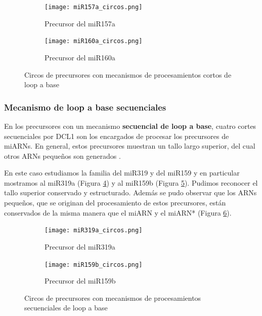 \begin{landscape}
	\begin{figure}
	\centering
	\begin{subfigure}{.75\textwidth}
	  \centering
	  \texttt{[image: miR157a\_circos.png]}
	  \caption{Precursor del miR157a}
	  \label{subfig:miR157a_circos}
	\end{subfigure}%
	\begin{subfigure}{.75\textwidth}
	  \centering
	  \texttt{[image: miR160a\_circos.png]}
	  \caption{Precursor del miR160a}
	  \label{subfig:miR160a_circos}
	\end{subfigure}
	\caption{Circos de precursores con mecanismos de procesamientos cortos de loop a base}
	\label{fig:srLTB_circos}
	\end{figure}
\end{landscape}

\subsubsection{Mecanismo de loop a base secuenciales}

En los precursores con un mecanismo \textbf{secuencial de loop a base}, cuatro cortes secuenciales por DCL1 son los encargados de procesar los precursores de miARNs.
En general, estos precursores muestran un tallo largo superior, del cual otros ARNs pequeños son generados \citep{pmid19850910,Bologna2009,Bologna2013}.

En este caso estudiamos la familia del miR319 y del miR159 y en particular mostramos al miR319a (Figura \ref{subfig:miR319a_circos}) y al miR159b (Figura \ref{subfig:miR159b_circos}).
Pudimos reconocer el tallo superior conservado y estructurado.
Además se pudo observar que los ARNs pequeños, que se originan del procesamiento de estos precursores, están conservados de la misma manera que el miARN y el miARN* (Figura \ref{fig:seqLTBL_circos}).

\begin{landscape}
	\begin{figure}
	\centering
	\begin{subfigure}{.75\textwidth}
	  \centering
	  \texttt{[image: miR319a\_circos.png]}
	  \caption{Precursor del miR319a}
	  \label{subfig:miR319a_circos}
	\end{subfigure}%
	\begin{subfigure}{.75\textwidth}
	  \centering
	  \texttt{[image: miR159b\_circos.png]}
	  \caption{Precursor del miR159b}
	  \label{subfig:miR159b_circos}
	\end{subfigure}
	\caption{Circos de precursores con mecanismos de procesamientos secuenciales de loop a base}
	\label{fig:seqLTBL_circos}
	\end{figure}
\end{landscape}


